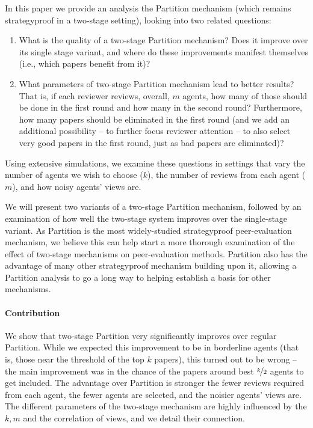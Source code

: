 \documentclass[letterpaper]{article}
\begin{document}
In this paper we provide an analysis the Partition mechanism (which remains strategyproof in a two-stage setting), looking into two related questions:
\begin{enumerate}
\item What is the quality of a two-stage Partition mechanism? Does it improve over its single stage variant, and where do these improvements manifest themselves (i.e., which papers benefit from it)?
\item What parameters of two-stage Partition mechanism lead to better results? That is, if each reviewer reviews, overall, $m$ agents, how many of those should be done in the first round and how many in the second round? Furthermore, how many papers should be eliminated in the first round (and we add an additional possibility -- to further focus reviewer attention -- to also select very good papers in the first round, just as bad papers are eliminated)?
\end{enumerate}
Using extensive simulations, we examine these questions in settings that vary the number of agents we wish to choose ($k$), the number of reviews from each agent ($m$), and how noisy agents' views are.

We will present two variants of a two-stage Partition mechanism, followed by an examination of how well the two-stage system improves over the single-stage variant. As Partition is the most widely-studied strategyproof peer-evaluation mechanism, we believe this can help start a more thorough examination of the effect of two-stage mechanisms on peer-evaluation methods. Partition also has the advantage of many other strategyproof mechanism building upon it, allowing a Partition analysis to go a long way to helping establish a basis for other mechanisms.

\paragraph{Contribution} We show that two-stage Partition very significantly improves over regular Partition. While we expected this improvement to be in borderline agents (that is, those near the threshold of the top $k$ papers), this turned out to be wrong -- the main improvement was in the chance of the papers around best $\nicefrac{k}{2}$ agents to get included. The advantage over Partition is stronger the fewer reviews required from each agent, the fewer agents are selected, and the noisier agents' views are. The different parameters of the two-stage mechanism are highly influenced by the $k,m$ and the correlation of views, and we detail their connection.
\end{document}
